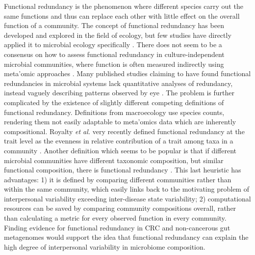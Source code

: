 \documentclass[11pt]{article}
\begin{document}
Functional redundancy is the phenomenon where different species carry out the same functions and thus can replace each other with little effect on the overall function of a community.
The concept of functional redundancy has been developed and explored in the field of ecology,
but few studies have directly applied it to microbial ecology specifically \cite{ricotta_measuring_2016}.
There does not seem to be a consensus on how to assess functional redundancy in culture-independent microbial communities,
where function is often measured indirectly using meta'omic approaches \cite{louca_function_2018, heintz-buschart_human_2018, tully_dynamic_2018, royalty_quantitative_2020}.
Many published studies claiming to have found functional redundancies in microbial systems lack quantitative analyses of redundancy,
instead vaguely describing patterns observed by eye \cite{souza_metagenomic_2015, ferrer_microbiota_2013, galambos_genome-resolved_2019}.
The problem is further complicated by the existence of slightly different competing definitions of functional redundancy.
Definitions from macroecology use species counts, rendering them not easily adaptable to meta'omics data which are inherently compositional.
Royalty \textit{et al.} very recently defined functional redundancy at the trait level as the evenness in relative contribution of a trait among taxa in a community \cite{royalty_quantitative_2020}.
Another definition which seems to be popular is that if different microbial communities have different taxonomic composition, but similar functional composition, there is functional redundancy \cite{louca_function_2018}.
This last heuristic has advantages:
1) it is defined by comparing different communities rather than within the same community, which easily links back to the motivating problem of interpersonal variability exceeding inter-disease state variability;
2) computational resources can be saved by comparing community compositions overall, rather than calculating a metric for every observed function in every community.
Finding evidence for functional redundancy in CRC and non-cancerous gut metagenomes would support the idea that functional redundancy can explain the high degree of interpersonal variability in microbiome composition.
\end{document}
